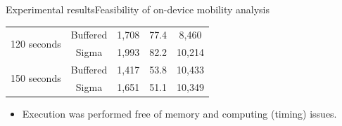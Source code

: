 \documentclass[8pt,xcolor={dvipsnames},handout]{beamer}
\begin{document}
\begin{frame}{Experimental results}{Feasibility of on-device mobility analysis}
\begin{table}
{\begin{tabular}{@{}ccccc@{}}
\multirow{2}{*}{120 seconds} & Buffered & 1,708 & 77.4 & 8,460 \\
 & Sigma & 1,993 & 82.2 & 10,214 \\
 \cmidrule{2-5}

\multirow{2}{*}{150 seconds} & Buffered & 1,417 & 53.8 & 10,433 \\
 & Sigma & 1,651 & 51.1 & 10,349 \\
 \bottomrule
\end{tabular}%
}
\end{table}

{
  \small{}
\begin{itemize}
  \item Execution was performed free of memory and computing (timing) issues.
\end{itemize}
}
\end{frame}
\end{document}
